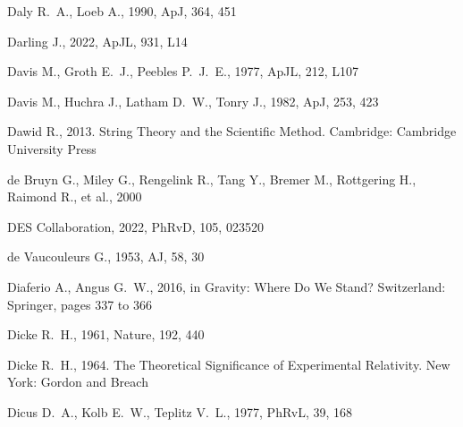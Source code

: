 \documentclass[fleqn,12pt]{article}
\begin{document}
\begin{thebibliography}{}
 Daly R.~A., Loeb A., 1990, ApJ, 364, 451


 Darling J., 2022, ApJL, 931, L14


 Davis M., Groth E.~J., Peebles P.~J.~E., 1977, ApJL, 212, L107

 Davis M., Huchra J., Latham D.~W., Tonry J., 1982, ApJ, 253, 423


 Dawid R., 2013.  String Theory and the Scientific Method. Cambridge: Cambridge University Press

 de Bruyn G., Miley G., Rengelink R., Tang Y., Bremer M., Rottgering H., Raimond R., et al., 2000

 DES Collaboration, 2022, PhRvD, 105, 023520

  de Vaucouleurs G., 1953, AJ, 58, 30

 Diaferio A., Angus G.~W., 2016, in Gravity: Where Do We Stand? Switzerland: Springer, pages 337 to 366

 Dicke R.~H., 1961, Nature, 192, 440

 Dicke R.~H., 1964. The Theoretical Significance of Experimental Relativity. New York: Gordon and Breach

 Dicus D.~A., Kolb E.~W., Teplitz V.~L., 1977, PhRvL, 39, 168
 

\end{thebibliography}
\end{document}
